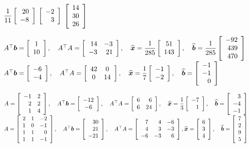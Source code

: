 
\begin{enumerate}[!HW!, start=1]
\begin{multicols}{3}
\itemspade $\dfrac{1}{11}\vr{20\\-8}$ %
\itemspade $\vr{-2\\3}$ %
\itemspade $\vr{14\\30\\26}$  %
\end{multicols}

\itemspade $A^\top \bb b =\mtx{c}{1\\10},\quad A^\top A = \mtx{rr}{14&-3\\-3&21},\quad \widehat{\bb x} = \dfrac{1}{285}\mtx{c}{51\\143},\quad \widehat{\bb b} = \dfrac{1}{285}\vr{-92\\439\\470}$ %
\itemspade $A^\top \bb b =\mtx{c}{-6\\-4},\quad A^\top A = \mtx{cc}{42&0\\0&14},\quad \widehat{\bb x} = \dfrac{1}{7}\mtx{c}{-1\\-2},\quad \widehat{\bb b} = \vr{-1\\-1\\0}$ %

\itemspade $A= \mtx{rr}{-1&2\\2&2\\1&4},\quad A^\top \bb b =\mtx{c}{-12\\-6},\quad A^\top A = \mtx{rr}{6&6\\6&24},\quad \widehat{\bb x} = \dfrac{1}{3}\mtx{r}{-7\\1},\quad \widehat{\bb b} = \vr{3\\-4\\-1}$ %
\itemspade $A= \mtx{rrr}{2&1&-2\\1&0&-1\\1&1&0\\1&1&-1},\quad A^\top \bb b =\mtx{r}{30\\21\\-21},\quad A^\top A = \mtx{rrr}{7&4&-6\\4&3&-3\\-6&-3&6}, \widehat{\bb x} = \mtx{r}{6\\3\\4},\quad\widehat{\bb b} = \vr{7\\2\\9\\5}$ %


\end{enumerate}
